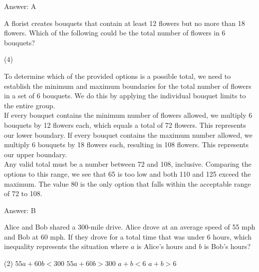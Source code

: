 \documentclass[11pt,paper=a4,answers]{exam}
\begin{document}
\begin{questions}
\begin{solution}
\vspace{15pt}
Answer: \colorbox{yellow!100}{A}
\end{solution}

\question
A florist creates bouquets that contain at least 12 flowers but no more than 18 flowers. Which of the following could be the total number of flowers in 6 bouquets?
\begin{tasks}(4)
\end{tasks}

\begin{solution}
To determine which of the provided options is a possible total, we need to establish the minimum and maximum boundaries for the total number of flowers in a set of 6 bouquets. We do this by applying the individual bouquet limits to the entire group.
\\[10pt]
If every bouquet contains the minimum number of flowers allowed, we multiply 6 bouquets by 12 flowers each, which equals a total of 72 flowers. This represents our lower boundary. If every bouquet contains the maximum number allowed, we multiply 6 bouquets by 18 flowers each, resulting in 108 flowers. This represents our upper boundary.
\\[10pt]
Any valid total must be a number between 72 and 108, inclusive. Comparing the options to this range, we see that 65 is too low and both 110 and 125 exceed the maximum. The value 80 is the only option that falls within the acceptable range of 72 to 108.

\vspace{15pt}
Answer: \colorbox{yellow!100}{B}
\end{solution}

\question
Alice and Bob shared a 300-mile drive. Alice drove at an average speed of 55 mph and Bob at 60 mph. If they drove for a total time that was under 6 hours, which inequality represents the situation where $a$ is Alice's hours and $b$ is Bob's hours?
\begin{tasks}(2)
    \task $55a + 60b < 300$
    \task $55a + 60b > 300$
    \task $a + b < 6$
    \task $a + b > 6$
\end{tasks}


\end{questions}
\end{document}
